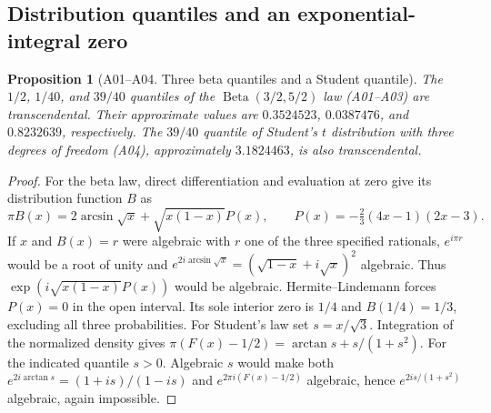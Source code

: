 \documentclass[11pt,a4paper]{article}
\newtheorem{proposition}[theorem]{Proposition}
\theoremstyle{definition}
\theoremstyle{remark}
\begin{document}
\subsection{Distribution quantiles and an exponential-integral zero}
\par\hypertarget{cat-A01}{}\label{page:A01}\hypertarget{cat-A02}{}\label{page:A02}\hypertarget{cat-A03}{}\label{page:A03}\hypertarget{cat-A04}{}\label{page:A04}
\begin{proposition}[A01--A04. Three beta quantiles and a Student quantile]
The $1/2$, $1/40$, and $39/40$ quantiles of the $\operatorname{Beta}(3/2,5/2)$
law (A01--A03) are transcendental. Their approximate values are
$0.3524523$, $0.0387476$, and $0.8232639$, respectively. The $39/40$
quantile of Student's $t$ distribution with three degrees of freedom
(A04), approximately $3.1824463$, is also transcendental.
\end{proposition}
\begin{proof}
For the beta law, direct differentiation and evaluation at zero give its
distribution function $B$ as
\[
 \pi B(x)=2\arcsin\sqrt{x}+\sqrt{x(1-x)}P(x),\qquad
 P(x)=-\tfrac23(4x-1)(2x-3).
\]
If $x$ and $B(x)=r$ were algebraic with $r$ one of the three specified
rationals, $e^{i\pi r}$ would be a root of unity and
$e^{2i\arcsin\sqrt{x}}=(\sqrt{1-x}+i\sqrt{x})^2$ algebraic. Thus
$\exp(i\sqrt{x(1-x)}P(x))$ would be algebraic. Hermite--Lindemann forces
$P(x)=0$ in the open interval. Its sole interior zero is $1/4$ and
$B(1/4)=1/3$, excluding all three probabilities.
For Student's law set $s=x/\sqrt3$. Integration of the normalized density
gives $\pi(F(x)-1/2)=\arctan s+s/(1+s^2)$. For the indicated quantile
$s>0$. Algebraic $s$ would make both $e^{2i\arctan s}=(1+is)/(1-is)$
and $e^{2\pi i(F(x)-1/2)}$ algebraic, hence $e^{2is/(1+s^2)}$ algebraic,
again impossible.
\end{proof}
\end{document}
